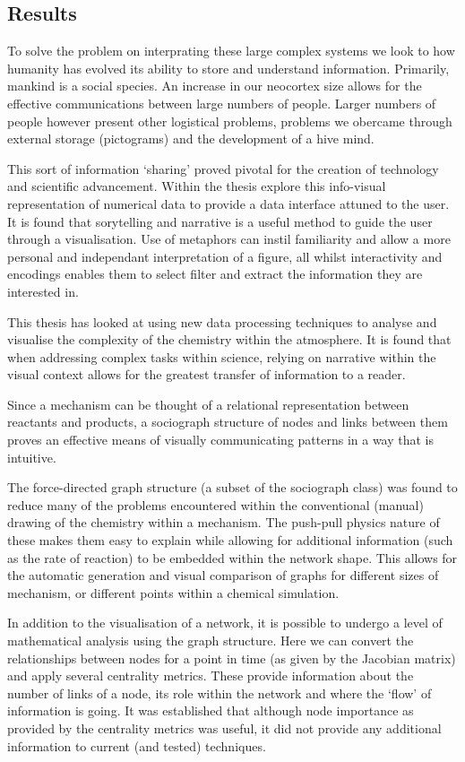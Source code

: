 \subsection{Results}

To solve the problem on interprating these large complex systems we look to how humanity has evolved its ability to store and understand information. Primarily, mankind is a social species. An increase in our neocortex size allows for the effective communications between large numbers of people. Larger numbers of people however present other logistical problems, problems we obercame through external storage (pictograms) and the development of a hive mind.

This sort of information `sharing' proved pivotal for the creation of technology and scientific advancement. Within the thesis explore this info-visual representation of numerical data to provide a data interface attuned to the user. It is found that sorytelling and narrative is a useful method to guide the user through a visualisation. Use of metaphors can instil familiarity and allow a more personal and independant interpretation of a figure, all whilst interactivity and encodings enables them to select filter and extract the information they are interested in. 




This thesis has looked at using new data processing techniques to analyse and visualise the complexity of the chemistry within the atmosphere. It is found that when addressing complex tasks within science, relying on narrative within the visual context allows for the greatest transfer of information to a reader.


Since a mechanism can be thought of a relational representation between reactants and products, a sociograph structure of nodes and links between them proves an effective means of visually communicating patterns in a way that is intuitive.

The force-directed graph structure (a subset of the sociograph class) was found to reduce many of the problems encountered within the conventional (manual) drawing of the chemistry within a mechanism. The push-pull physics nature of these makes them easy to explain while allowing for additional information (such as the rate of reaction) to be embedded within the network shape. This allows for the automatic generation and visual comparison of graphs for different sizes of mechanism, or different points within a chemical simulation.

In addition to the visualisation of a network, it is possible to undergo a level of mathematical analysis using the graph structure. Here we can convert the relationships between nodes for a point in time (as given by the Jacobian matrix) and apply several centrality metrics. These provide information about the number of links of a node,  its role within the network and where the `flow' of information is going. It was established that although node importance as provided by the centrality metrics was useful, it did not provide any additional information to current (and tested) techniques.

